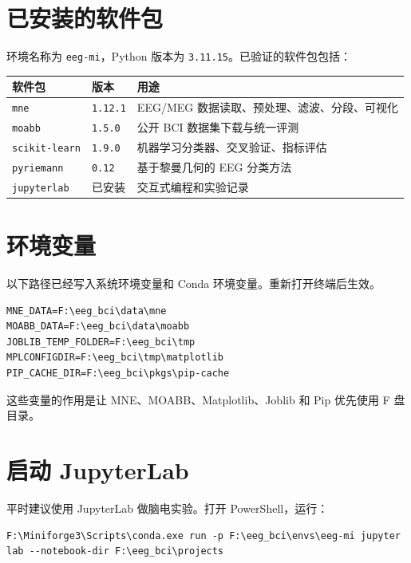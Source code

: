 \documentclass[UTF8,a4paper,12pt]{ctexart}
\begin{document}
\section{已安装的软件包}

环境名称为 \texttt{eeg-mi}，Python 版本为 \texttt{3.11.15}。已验证的软件包包括：

\begin{table}[h]
\centering
\begin{tabular}{lll}
\toprule
软件包 & 版本 & 用途 \\
\midrule
\texttt{mne} & \texttt{1.12.1} & EEG/MEG 数据读取、预处理、滤波、分段、可视化 \\
\texttt{moabb} & \texttt{1.5.0} & 公开 BCI 数据集下载与统一评测 \\
\texttt{scikit-learn} & \texttt{1.9.0} & 机器学习分类器、交叉验证、指标评估 \\
\texttt{pyriemann} & \texttt{0.12} & 基于黎曼几何的 EEG 分类方法 \\
\texttt{jupyterlab} & 已安装 & 交互式编程和实验记录 \\
\bottomrule
\end{tabular}
\end{table}

\section{环境变量}

以下路径已经写入系统环境变量和 Conda 环境变量。重新打开终端后生效。

\begin{lstlisting}[language={},caption={已配置的环境变量}]
MNE_DATA=F:\eeg_bci\data\mne
MOABB_DATA=F:\eeg_bci\data\moabb
JOBLIB_TEMP_FOLDER=F:\eeg_bci\tmp
MPLCONFIGDIR=F:\eeg_bci\tmp\matplotlib
PIP_CACHE_DIR=F:\eeg_bci\pkgs\pip-cache
\end{lstlisting}

这些变量的作用是让 MNE、MOABB、Matplotlib、Joblib 和 Pip 优先使用 F 盘目录。

\section{启动 JupyterLab}

平时建议使用 JupyterLab 做脑电实验。打开 PowerShell，运行：

\begin{lstlisting}[language={},caption={启动 JupyterLab}]
F:\Miniforge3\Scripts\conda.exe run -p F:\eeg_bci\envs\eeg-mi jupyter lab --notebook-dir F:\eeg_bci\projects
\end{lstlisting}
\end{document}
